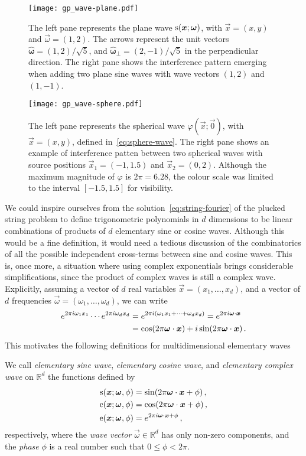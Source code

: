 \begin{figure}[t]
  \centering
  \texttt{[image: gp\_wave-plane.pdf]}
  \caption{The left pane represents the plane wave $\sw(\vec{x};\vec{\omega})$, with
    $\vec{x}=(x,y)$ and $\vec{\omega}=(1,2)$. The arrows represent the unit vectors
    $\hat{\bm{\omega}}=(1,2)/\sqrt{5}$, and $\hat{\bm{\omega}}_{\perp}=(2,-1)/\sqrt{5}$ in
    the perpendicular direction. The right pane shows the interference pattern emerging
  when adding two plane sine waves with wave vectors $(1,2)$ and $(1,-1)$.}
  \label{fig:plane-wave}
\end{figure}
\begin{figure}[t]
  \centering
  \texttt{[image: gp\_wave-sphere.pdf]}
  \caption{The left pane represents the spherical wave $\varphi(\vec{x};\vec{0})$, with
    $\vec{x}=(x,y)$, defined in~\cref{eq:sphere-wave}. The right pane shows an example of
    interference patten between two spherical waves with source positions
    $\vec{x}_1=(-1,1.5)$ and $\vec{x}_2=(0,2)$. Although the maximum magnitude of
    $\varphi$ is $2\pi=6.28$, the colour scale was limited to the interval $[-1.5,1.5]$
  for visibility.}
  \label{fig:sphere-wave}
\end{figure}
We could inspire ourselves from the solution~\cref{eq:string-fourier} of the plucked
string problem to define trigonometric polynomials in $d$ dimensions to be linear
combinations of products of $d$ elementary sine or cosine waves. Although this would be a
fine definition, it would need a tedious discussion of the combinatorics of all the
possible independent cross-terms between sine and cosine waves. This is, once more, a
situation where using complex exponentials brings considerable simplifications, since the
product of complex waves is still a complex wave. Explicitly, assuming a vector of $d$
real variables $\vec{x}=(x_1,\dots,x_d)$, and a vector of $d$ frequencies
$\vec{\omega}=(\omega_1,\dots,\omega_d)$, we can write
\begin{align}
  e^{2\pi i\omega_1x_1}\cdots e^{2\pi i\omega_dx_d}
  &=e^{2\pi i(\omega_1x_1+\cdots+\omega_dx_d)}=e^{2\pi i\vec{\omega}\cdotp\vec{x}}\notag\\
  &=\cos(2\pi\vec{\omega}\cdot\vec{x})+i\sin(2\pi\vec{\omega}\cdot\vec{x})\,.
\end{align}
This motivates the following definitions for multidimensional elementary waves
\begin{definition}
  \label{def:multidim-waves}
  We call \emph{elementary sine wave}, \emph{elementary cosine wave}, and \emph{elementary
  complex wave} on $\mathbb{R}^d$ the functions defined by
  \begin{align}
    \sw(\vec{x};\vec{\omega},\phi)&=\sin(2\pi\vec{\omega}\cdot\vec{x}+\phi)\,,\\
    \cw(\vec{x};\vec{\omega},\phi)&=\cos(2\pi\vec{\omega}\cdot\vec{x}+\phi)\,,\\
    \ew(\vec{x};\vec{\omega},\phi)&=e^{2\pi i\vec{\omega}\cdotp\vec{x}+\phi}\,,
  \end{align}
  respectively, where the \emph{wave vector} $\vec{\omega}\in\mathbb{R}^d$ has only
  non-zero components, and the \emph{phase} $\phi$ is a real number such that $0\leq \phi
  <2\pi$.
\end{definition}

